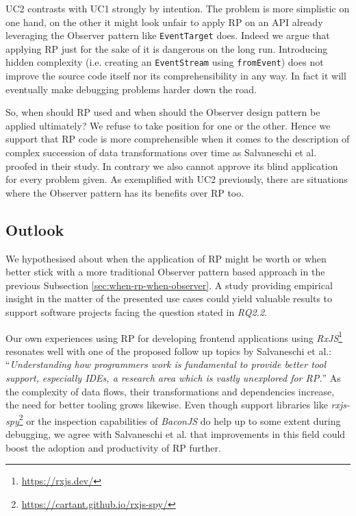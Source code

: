 \documentclass[12pt,a4paper]{article}
\begin{document}
UC2 contrasts with UC1 strongly by intention. The problem is more simplistic on one hand, on the other it might look unfair to apply RP on an API already leveraging the Observer pattern like \texttt{EventTarget} does. Indeed we argue that applying RP just for the sake of it is dangerous on the long run. Introducing hidden complexity (i.e. creating an \texttt{EventStream} using \texttt{fromEvent}) does not improve the source code itself nor its comprehensibility in any way. In fact it will eventually make debugging problems harder down the road.

So, when should RP used and when should the Observer design pattern be applied ultimately? We refuse to take position for one or the other. Hence we support that RP code is more comprehensible when it comes to the description of complex succession of data transformations over time as Salvaneschi et al. proofed in their study. In contrary we also cannot approve its blind application for every problem given. As exemplified with UC2 previously, there are situations where the Observer pattern has its benefits over RP too.

\subsection{Outlook}

We hypothesised about when the application of RP might be worth or when better stick with a more traditional Observer pattern based approach in the previous Subsection \ref{sec:when-rp-when-observer}. A study providing empirical insight in the matter of the presented use cases could yield valuable results to support software projects facing the question stated in \emph{RQ2.2}.

Our own experiences using RP for developing frontend applications using \emph{RxJS}\footnote{\url{https://rxjs.dev/}} resonates well with one of the proposed follow up topics by Salvaneschi et al.: ``\emph{Understanding how programmers work is fundamental to provide better tool support, especially IDEs, a research area which is vastly unexplored for RP.}''\cite{7827078} As the complexity of data flows, their transformations and dependencies increase, the need for better tooling grows likewise. Even though support libraries like \emph{rxjs-spy}\footnote{\url{https://cartant.github.io/rxjs-spy/}} or the inspection capabilities of \emph{BaconJS} do help up to some extent during debugging, we agree with Salvaneschi et al. that improvements in this field could boost the adoption and productivity of RP further.
\end{document}
